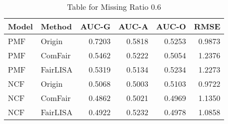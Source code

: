 \begin{table}
\centering
\caption{Table for Missing Ratio 0.6}
\label{tab:missing_0.6}
\begin{tabular}{llrrrr}
\toprule
Model &   Method &  AUC-G &  AUC-A &  AUC-O &   RMSE \\
\midrule
  PMF &   Origin & 0.7203 & 0.5818 & 0.5253 & 0.9873 \\
  PMF &  ComFair & 0.5462 & 0.5222 & 0.5054 & 1.2376 \\
  PMF & FairLISA & 0.5319 & 0.5134 & 0.5234 & 1.2273 \\
  NCF &   Origin & 0.5068 & 0.5003 & 0.5103 & 0.9722 \\
  NCF &  ComFair & 0.4862 & 0.5021 & 0.4969 & 1.1350 \\
  NCF & FairLISA & 0.4922 & 0.5232 & 0.4978 & 1.0858 \\
\bottomrule
\end{tabular}
\end{table}
